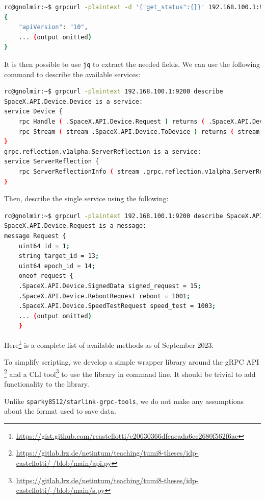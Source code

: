 \documentclass[IN,11pt,twoside,openright,idp,english]{tumthesis}
\begin{document}
\begin{lstlisting}[language=bash]
rc@gnolmir:~$ grpcurl -plaintext -d '{"get_status":{}}' 192.168.100.1:9200 SpaceX.API.Device.Device/Handle
{
    "apiVersion": "10",
    ... (output omitted)
}
\end{lstlisting}

It is then possible to use \texttt{jq} to extract the needed fields. We can use the following command to describe the
available services:
    
\begin{lstlisting}[language=bash]
rc@gnolmir:~$ grpcurl -plaintext 192.168.100.1:9200 describe
SpaceX.API.Device.Device is a service:
service Device {
    rpc Handle ( .SpaceX.API.Device.Request ) returns ( .SpaceX.API.Device.Response );
    rpc Stream ( stream .SpaceX.API.Device.ToDevice ) returns ( stream .SpaceX.API.Device.FromDevice );
}
grpc.reflection.v1alpha.ServerReflection is a service:
service ServerReflection {
    rpc ServerReflectionInfo ( stream .grpc.reflection.v1alpha.ServerReflectionRequest ) returns ( stream .grpc.reflection.v1alpha.ServerReflectionResponse );
}
\end{lstlisting}
    
Then, describe the single service using the following:
    
\begin{lstlisting}[language=bash]
rc@gnolmir:~$ grpcurl -plaintext 192.168.100.1:9200 describe SpaceX.API.Device.Request
SpaceX.API.Device.Request is a message:
message Request {
    uint64 id = 1;
    string target_id = 13;
    uint64 epoch_id = 14;
    oneof request {
    .SpaceX.API.Device.SignedData signed_request = 15;
    .SpaceX.API.Device.RebootRequest reboot = 1001;
    .SpaceX.API.Device.SpeedTestRequest speed_test = 1003;
    ... (output omitted)
    }
\end{lstlisting}
    
Here\footnote{\url{https://gist.github.com/rcastellotti/e20630366dfeaeada6cc2680f562f6ac}} is a complete list of
available methods as of September 2023.

To simplify scripting, we develop a simple wrapper library around the gRPC API
\footnote{\url{https://gitlab.lrz.de/netintum/teaching/tumi8-theses/idp-castellotti/-/blob/main/api.py}} and a CLI
tool\footnote{\url{https://gitlab.lrz.de/netintum/teaching/tumi8-theses/idp-castellotti/-/blob/main/s.py}} to use the
library in command line. It should be trivial to add functionality to the library.

Unlike \texttt{sparky8512/starlink-grpc-tools}, we do not make any assumptions about the format used to save data.
\end{document}
